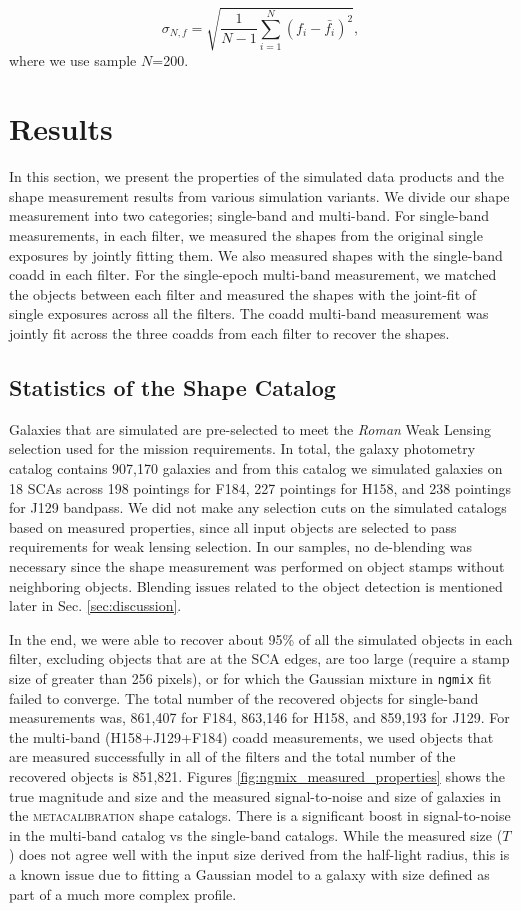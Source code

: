 \documentclass[fleqn,usenatbib]{mnras}
\begin{document}
\begin{equation}
    \sigma_{N,f} = \sqrt{\frac{1}{N-1} \sum_{i=1}^{N}(f_{i}-\bar{f_{i}})^{2}}, 
\end{equation}
where we use sample $N$=200.


\section{Results}
\label{sec:results}
In this section, we present the properties of the simulated data products and the shape measurement results from various simulation variants. We divide our shape measurement into two categories; single-band and multi-band. For single-band measurements, in each filter, we measured the shapes from the original single exposures by jointly fitting them. We also measured shapes with the single-band coadd in each filter. For the single-epoch multi-band measurement, we matched the objects between each filter and measured the shapes with the joint-fit of single exposures across all the filters. The coadd multi-band measurement was jointly fit across the three coadds from each filter to recover the shapes. 

\subsection{Statistics of the Shape Catalog}
Galaxies that are simulated are pre-selected to meet the \emph{Roman} Weak Lensing selection used for the mission requirements. In total, the galaxy photometry catalog contains 907,170 galaxies and from this catalog we simulated galaxies on 18 SCAs across 198 pointings for F184, 227 pointings for H158, and 238 pointings for J129 bandpass. We did not make any selection cuts on the simulated catalogs based on measured properties, since all input objects are selected to pass requirements for weak lensing selection. In our samples, no de-blending was necessary since the shape measurement was performed on object stamps without neighboring objects. Blending issues related to the object detection is mentioned later in Sec. \ref{sec:discussion}. 

In the end, we were able to recover about 95\% of all the simulated objects in each filter, excluding objects that are at the SCA edges, are too large (require a stamp size of greater than 256 pixels), or for which the Gaussian mixture in \texttt{ngmix} fit failed to converge. The total number of the recovered objects for single-band measurements was, 861,407 for F184, 863,146 for H158, and 859,193 for J129. For the multi-band (H158+J129+F184) coadd measurements, we used objects that are measured successfully in all of the filters and the total number of the recovered objects is 851,821.
Figures \ref{fig:ngmix_measured_properties} shows the true magnitude and size and the measured signal-to-noise and size of galaxies in the \textsc{metacalibration} shape catalogs. There is a significant boost in signal-to-noise in the multi-band catalog vs the single-band catalogs. While the measured size ($T$) does not agree well with the input size derived from the half-light radius, this is a known issue due to fitting a Gaussian model to a galaxy with size defined as part of a much more complex profile.
\end{document}
